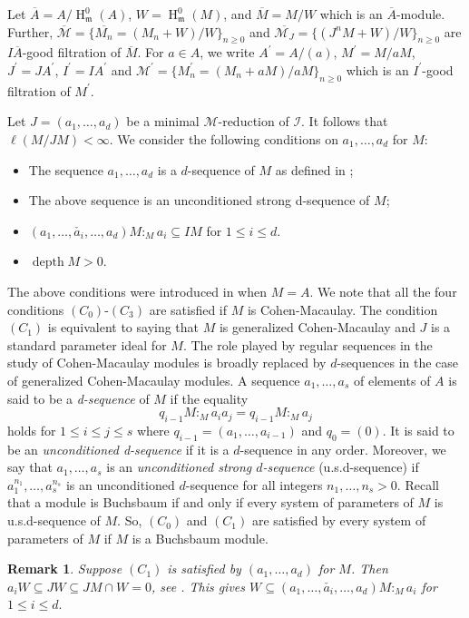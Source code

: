 \documentclass[11pt,reqno]{amsart}
\newtheorem{remark}[theorem]{Remark}
\theoremstyle{definition}
\newcommand{\m}{\mathfrak m}
\def\M{{\mathcal M}}
\def\I{{\mathcal I}}
\DeclareMathOperator{\h}{H}
\DeclareMathOperator{\depth}{depth}
\numberwithin{equation}{section}
\begin{document}
Let $\overline{A}=A/\h_{\m}^0(A)$, $W=\h_{\m}^0(M)$, and $\overline{M}=M/W$ which is an $\overline{A}$-module. Further, $\overline{\M}=\{ \overline{M_n}=(M_n+W)/W\}_{n\geq 0}$ and $\overline{\M_J}=\{(J^nM+W)/W\}_{n\geq 0}$  are $I\overline{A}$-good filtration of $\overline{M}$.
For  $a\in A$, we write $A^\prime=A/(a)$, $M^\prime=M/aM$, $J^\prime=JA^\prime$, $I^\prime=IA^\prime$ and  $\M^\prime=\{M_n^\prime=(M_n+aM)/aM\}_{n\geq 0}$ which is an $I^\prime$-good filtration of $M^\prime$.  

Let $J=(a_1,\ldots,a_d)$ be a minimal $\M$-reduction of $\I$. 
It follows that $\ell(M/JM)<\infty.$ We consider the following conditions on $a_1,\ldots,a_d$ for $M$: 
	\begin{itemize}
	\item[$(C_0)$] The sequence $a_1,\ldots,a_d$ is a $d$-sequence of $M$ as defined in \cite{adt};
	\item[$(C_1)$] The above sequence is an unconditioned strong d-sequence of $M$;
	\item[$(C_2)$]  $(a_1,\ldots, \check{a_i},\ldots,a_d)M:_Ma_i\subseteq IM$   for $1\leq i\leq d$.
	\item[$(C_3)$] $\depth  M>0$.
\end{itemize}
The above conditions were introduced in \cite{ozeki13} when $M=A$. We note that
all the four conditions $(C_0)$-$(C_3)$ are satisfied if $M$ is Cohen-Macaulay. The condition $(C_1)$ is equivalent to saying that $M$ is generalized Cohen-Macaulay and $J$ is a standard parameter ideal for $M$. The role played by regular sequences in the study of Cohen-Macaulay modules is broadly replaced
by $d$-sequences in the case of generalized Cohen-Macaulay modules. 
A sequence $a_1,\ldots,a_s$ of elements of $A$ is said to be a {\textit{d-sequence}} of $M$ if the equality 
\[q_{i-1}M:_M a_ia_j=q_{i-1}M:_M a_j\] holds for $1\leq i\leq j\leq s$ where 
$q_{i-1}=(a_1,\ldots,a_{i-1})$ and $q_0=(0)$. It is said to be an {\textit{unconditioned d-sequence}} if it is a $d$-sequence in any order. Moreover, we say that $a_1,\ldots,a_s$ is an {\textit{unconditioned strong $d$-sequence}} (u.s.d-sequence) if $a_1^{n_1},\ldots,a_s^{n_s}$ is an  unconditioned $d$-sequence for  all integers $n_1,\ldots,n_s>0$. 
Recall that a module is Buchsbaum if and only if every system of parameters of $M$ is u.s.d-sequence of $M$. So,  $(C_0)$ and $(C_1)$ are satisfied by every system of parameters of $M$ if $M$ is a Buchsbaum module. 


\begin{remark}\label{remark-nota}
Suppose  $(C_1)$ is satisfied by $(a_1,\ldots,a_d)$ for $M$. Then $a_i W\subseteq JW\subseteq JM\cap W=0$,  see \cite[Corollary 2.3]{trung-gcm}. This gives 
$ W\subseteq (a_1,\ldots, \check{a_i},\ldots,a_d)M:_Ma_i$ for $1\leq i\leq d.$
\end{remark}
\end{document}
